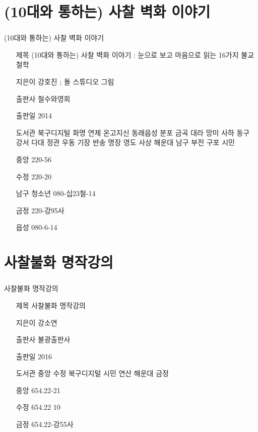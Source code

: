 \documentclass[aspectratio=1610,14pt,xcolor=pdftex,dvipsnames,table,handout]{beamer}
\begin{document}
		\section{ (10대와 통하는) 사찰 벽화 이야기 }
		\begin{frame} [t,plain]
		\frametitle{}
			\begin{block} { (10대와 통하는) 사찰 벽화 이야기 }
			\setlength{\leftmargini}{4em}			
			\begin{itemize}
				\item [제목]  	(10대와 통하는) 사찰 벽화 이야기 : 눈으로 보고 마음으로 읽는 16가지 불교 철학
				\item [지은이]	강호진 ; 돌 스튜디오 그림
				\item [출판사]	철수와영희
				\item [출판일]	2014

				\item [도서관]		북구디지털 화명 연제 온고지신 동래읍성 분포 금곡 대라 망미 사하 동구 강서 다대 정관 우동 기장 반송 명장 영도 사상 해운대 남구 부전 구포 시민 

				\item [중앙]		220-56
				\item [수정]		220-20
				\item [남구] 	청소년 080-십23철-14
				\item [금정] 	220-강95사
				\item [읍성] 	080-6-14
			\end{itemize}
			\end{block}						
								
		\end{frame}						



		\section{ 사찰불화 명작강의 }
		\begin{frame} [t,plain]
		\frametitle{}
			\begin{block} { 사찰불화 명작강의 }
			\setlength{\leftmargini}{4em}			
			\begin{itemize}
				\item [제목]  	사찰불화 명작강의 
				\item [지은이]	강소연 
				\item [출판사]	불광출판사 
				\item [출판일]	2016 

				\item [도서관]	중앙 수정 북구디지털 시민 연산 해운대 금정 	
				\item [중앙]		654.22-21
				\item [수정]		654.22 10
				\item [금정] 	654.22-강55사 

			\end{itemize}
			\end{block}						
								
		\end{frame}						
\end{document}

